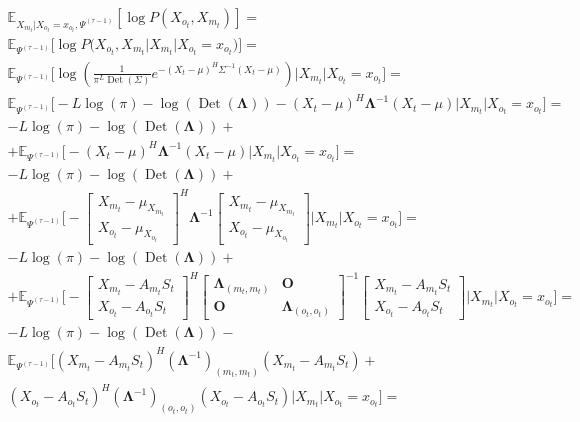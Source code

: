 \documentclass[11pt]{article}
\newcommand{\Expect}{\mathbb{E}}
\DeclareMathOperator{\Det}{Det}
\begin{document}
\begin{equation*}
\begin{gathered}
\Expect_{X_{m_t}|X_{o_t}=x_{o_t}, \Psi^{(\tau-1)}}[\log P(X_{o_t}, X_{m_t})]=\\
\Expect_{\Psi^{(\tau-1)}}\Big[\log P\Big(X_{o_t}, X_{m_t}\Big|X_{m_t}|X_{o_t}=x_{o_t}\Big)\Big]=\\
\Expect_{\Psi^{(\tau-1)}}\bigg[\log \left(\frac{1}{\pi^{L}\Det(\Sigma)}e^{-(X_t-\mu)^H\Sigma^{-1}(X_t-\mu)}\right)\Big|X_{m_t}|X_{o_t}=x_{o_t}\bigg]=\\
\Expect_{\Psi^{(\tau-1)}}\bigg[-L \log(\pi) - \log (\Det(\mathbf{\Lambda})) - (X_t - \mu)^H\mathbf{\Lambda}^{-1}(X_t - \mu)\Big|X_{m_t}|X_{o_t}=x_{o_t}\bigg]=\\
-L \log(\pi) - \log (\Det(\mathbf{\Lambda})) + \\ + \Expect_{\Psi^{(\tau-1)}}\bigg[- (X_t - \mu)^H\mathbf{\Lambda}^{-1}(X_t - \mu)\Big|X_{m_t}|X_{o_t}=x_{o_t}\bigg]=\\
-L \log(\pi) - \log (\Det(\mathbf{\Lambda}))  + \\ + \Expect_{\Psi^{(\tau-1)}}\bigg[- 
\begin{bmatrix} X_{m_t} - \mu_{X_{m_t}} \\  X_{o_t} - \mu_{X_{o_t}} \end{bmatrix}^H \mathbf{\Lambda}^{-1}
\begin{bmatrix} X_{m_t} - \mu_{X_{m_t}} \\  X_{o_t} - \mu_{X_{o_t}} \end{bmatrix}\Big|X_{m_t}|X_{o_t}=x_{o_t}\bigg] = \\
-L \log(\pi) - \log (\Det(\mathbf{\Lambda}))  + \\ + \Expect_{\Psi^{(\tau-1)}}\bigg[- 
\begin{bmatrix} X_{m_t} - A_{m_t}S_t \\  X_{o_t} - A_{o_t}S_t  \end{bmatrix}^H
\begin{bmatrix} \mathbf{\Lambda}_{(m_t, m_t)} & \mathbf{O} \\  \mathbf{O} & \mathbf{\Lambda}_{(o_t, o_t)} \end{bmatrix}^{-1}
\begin{bmatrix} X_{m_t} - A_{m_t}S_t \\  X_{o_t} - A_{o_t}S_t  \end{bmatrix}\Big|X_{m_t}|X_{o_t}=x_{o_t}\bigg] = \\
-L \log(\pi) - \log (\Det(\mathbf{\Lambda}))  - \\ \Expect_{\Psi^{(\tau-1)}}
\bigg[ (X_{m_t} - A_{m_t}S_t)^H (\mathbf{\Lambda}^{-1})_{(m_t, m_t)} (X_{m_t} - A_{m_t}S_t) + \\
(X_{o_t} - A_{o_t}S_t)^H (\mathbf{\Lambda}^{-1})_{(o_t, o_t)} (X_{o_t} - A_{o_t}S_t)
\Big|X_{m_t}|X_{o_t}=x_{o_t}\bigg] = \\
\end{gathered}
\end{equation*}
\end{document}
